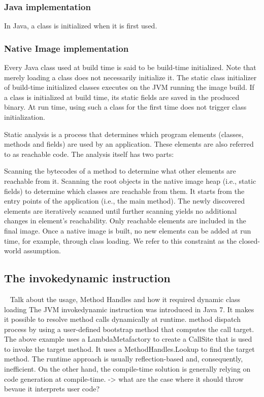\subsubsection{Java implementation}
In Java, a class is initialized when it is first used.
\subsubsection{Native Image implementation}
Every Java class used at build time is said to be build-time initialized. Note that merely loading a class does not necessarily initialize it. The static class initializer of build-time initialized classes executes on the JVM running the image build. If a class is initialized at build time, its static fields are saved in the produced binary. At run time, using such a class for the first time does not trigger class initialization.

Static analysis is a process that determines which program elements (classes, methods and fields) are used by an application. These elements are also referred to as reachable code. The analysis itself has two parts:

Scanning the bytecodes of a method to determine what other elements are reachable from it.
Scanning the root objects in the native image heap (i.e., static fields) to determine which classes are reachable from them. It starts from the entry points of the application (i.e., the main method). The newly discovered elements are iteratively scanned until further scanning yields no additional changes in element’s reachability.
Only reachable elements are included in the final image. Once a native image is built, no new elements can be added at run time, for example, through class loading. We refer to this constraint as the closed-world assumption.

\subsection{The invokedynamic instruction}
~\cite{rose_bytecodes_2009}
Talk about the usage, Method Handles and how it required dynamic class loading
The JVM invokedynamic instruction was introduced in Java 7. It makes it possible to resolve method calls dynamically at runtime. method dispatch process by using a user-defined bootstrap method that computes the call target.
The above example uses a LambdaMetafactory to create a CallSite that is used to invoke the target method. It uses a MethodHandles.Lookup to find the target method.
The runtime approach is usually reflection-based and, consequently, inefficient. On the other hand, the compile-time solution is generally relying on code generation at compile-time. 
-> what are the case where it should throw bevaue it interprets user code?


